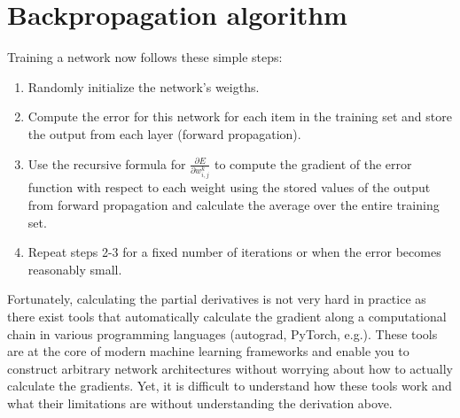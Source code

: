 \section{Backpropagation algorithm}

Training a network now follows these simple steps:
\begin{enumerate}
\item Randomly initialize the network's weigths.
\item Compute the error for this network for each item in the training set and store the output from each layer (forward propagation).
\item Use the recursive formula for $\frac{\partial E}{\partial w^k_{i,j}}$ to compute the gradient of the error function with respect to each weight using the stored values of the output from forward propagation and calculate the average over the entire training set.
\item Repeat steps 2-3 for a fixed number of iterations or when the error becomes reasonably small.
\end{enumerate}

Fortunately, calculating the partial derivatives is not very hard in practice as there exist tools that automatically calculate the gradient along a computational chain in various programming languages (autograd, PyTorch, e.g.). These tools are at the core of modern machine learning frameworks and enable you to construct arbitrary network architectures without worrying about how to actually calculate the gradients. Yet, it is difficult to understand how these tools work and what their limitations are without understanding the derivation above.
